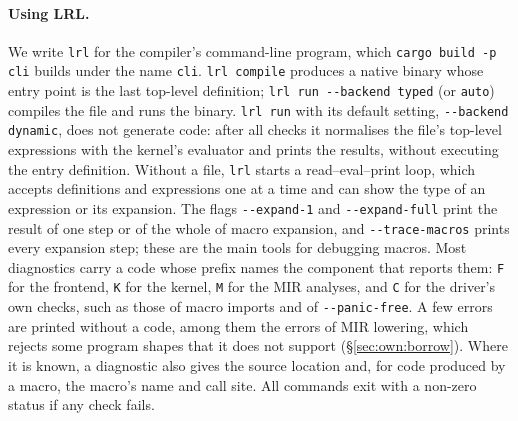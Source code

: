 \paragraph{Using LRL.}
We write \texttt{lrl} for the compiler's command-line program, which \texttt{cargo build -p cli} builds under the name \texttt{cli}.
\texttt{lrl compile} produces a native binary whose entry point is the last top-level definition; \texttt{lrl run -{}-backend typed} (or \texttt{auto}) compiles the file and runs the binary.
\texttt{lrl run} with its default setting, \texttt{-{}-backend dynamic}, does not generate code: after all checks it normalises the file's top-level expressions with the kernel's evaluator and prints the results, without executing the entry definition.
Without a file, \texttt{lrl} starts a read--eval--print loop, which accepts definitions and expressions one at a time and can show the type of an expression or its expansion.
The flags \texttt{-{}-expand-1} and \texttt{-{}-expand-full} print the result of one step or of the whole of macro expansion, and \texttt{-{}-trace-macros} prints every expansion step; these are the main tools for debugging macros.
Most diagnostics carry a code whose prefix names the component that reports them: \texttt{F} for the frontend, \texttt{K} for the kernel, \texttt{M} for the MIR analyses, and \texttt{C} for the driver's own checks, such as those of macro imports and of \texttt{-{}-panic-free}. A few errors are printed without a code, among them the errors of MIR lowering, which rejects some program shapes that it does not support (\S\ref{sec:own:borrow}). Where it is known, a diagnostic also gives the source location and, for code produced by a macro, the macro's name and call site.
All commands exit with a non-zero status if any check fails.
